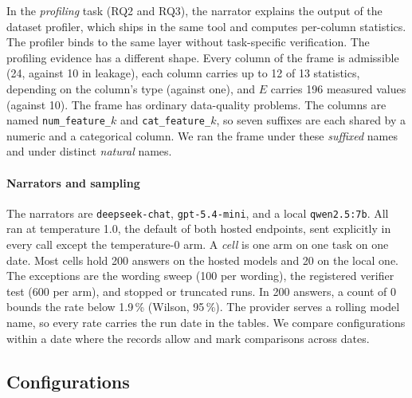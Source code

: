 \documentclass[journal]{IEEEtran}
\begin{document}
In the \emph{profiling} task (RQ2 and RQ3), the narrator explains the output of
the dataset profiler, which ships in the same tool and computes per-column
statistics. The profiler binds to the same layer without task-specific
verification. The profiling evidence has a different shape. Every column of the
frame is admissible (24, against 10 in leakage), each column carries up to 12 of
13 statistics, depending on the column's type (against one), and $E$ carries 196
measured values (against 10). The frame has ordinary data-quality problems. The
columns are named \texttt{num\_feature\_$k$} and \texttt{cat\_feature\_$k$}, so
seven suffixes are each shared by a numeric and a categorical column. We ran the
frame under these \emph{suffixed} names and under distinct \emph{natural} names.

\paragraph{Narrators and sampling}
The narrators are \texttt{deepseek-chat}, \texttt{gpt-5.4-mini}, and a local
\texttt{qwen2.5:7b}. All ran at temperature 1.0, the default of both hosted
endpoints, sent explicitly in every call except the temperature-0 arm. A
\emph{cell} is one arm on one task on one date. Most cells hold 200 answers on
the hosted models and 20 on the local one. The exceptions are the wording sweep
(100 per wording), the registered verifier test (600 per arm), and stopped or
truncated runs. In 200 answers, a count of 0 bounds the rate below 1.9\,\%
(Wilson, 95\,\%). The provider serves a rolling model name, so every rate carries
the run date in the tables. We compare configurations within a date where the
records allow and mark comparisons across dates.

\subsection{Configurations}\label{sec:configs}
\end{document}
